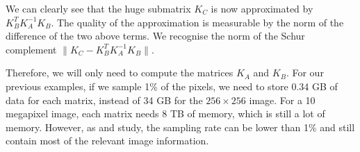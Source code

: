 We can clearly see that the huge submatrix \(K_C\) is now approximated by \(K_B^T K_A^{-1} K_B\).
The quality of the approximation is measurable by the norm of the difference of the two above terms.
We recognise the norm of the Schur complement \(\| K_C - K_B^T K_A^{-1} K_B \| \).

Therefore, we will only need to compute the matrices \(K_A\) and \(K_B\).
For our previous examples, if we sample 1\% of the pixels, we need to store 0.34 GB of data for each matrix, instead of 34 GB for the \(256 \times 256\) image.
For a 10 megapixel image, each matrix needs 8 TB of memory, which is still a lot of memory.
However, as \cite{fowlkes_spectral_2004} and \cite{glide_2014} study, the sampling rate can be lower than 1\% and still contain most of the relevant image information.
